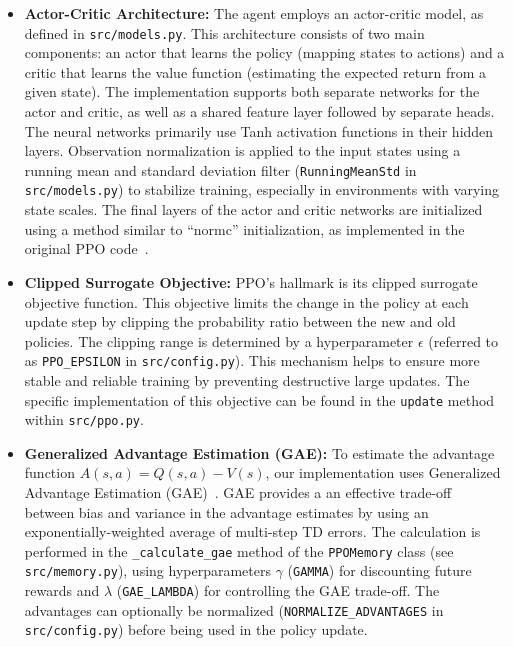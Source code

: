 \begin{itemize}
    \item \textbf{Actor-Critic Architecture:} The agent employs an actor-critic model, as defined in \texttt{src/models.py}. This architecture consists of two main components: an actor that learns the policy (mapping states to actions) and a critic that learns the value function (estimating the expected return from a given state). The implementation supports both separate networks for the actor and critic, as well as a shared feature layer followed by separate heads. The neural networks primarily use Tanh activation functions in their hidden layers. Observation normalization is applied to the input states using a running mean and standard deviation filter (\texttt{RunningMeanStd} in \texttt{src/models.py}) to stabilize training, especially in environments with varying state scales. The final layers of the actor and critic networks are initialized using a method similar to ``normc'' initialization, as implemented in the original PPO code~\cite{PPOcode}.

    \item \textbf{Clipped Surrogate Objective:} PPO's hallmark is its clipped surrogate objective function. This objective limits the change in the policy at each update step by clipping the probability ratio between the new and old policies. The clipping range is determined by a hyperparameter $\epsilon$ (referred to as \texttt{PPO\_EPSILON} in \texttt{src/config.py}). This mechanism helps to ensure more stable and reliable training by preventing destructive large updates. The specific implementation of this objective can be found in the \texttt{update} method within \texttt{src/ppo.py}.

    \item \textbf{Generalized Advantage Estimation (GAE):} To estimate the advantage function $A(s,a) = Q(s,a) - V(s)$, our implementation uses Generalized Advantage Estimation (GAE)~\cite{schulman2015high}. GAE provides a an effective trade-off between bias and variance in the advantage estimates by using an exponentially-weighted average of multi-step TD errors. The calculation is performed in the \texttt{\_calculate\_gae} method of the \texttt{PPOMemory} class (see \texttt{src/memory.py}), using hyperparameters $\gamma$ (\texttt{GAMMA}) for discounting future rewards and $\lambda$ (\texttt{GAE\_LAMBDA}) for controlling the GAE trade-off. The advantages can optionally be normalized (\texttt{NORMALIZE\_ADVANTAGES} in \texttt{src/config.py}) before being used in the policy update.


\end{itemize}
